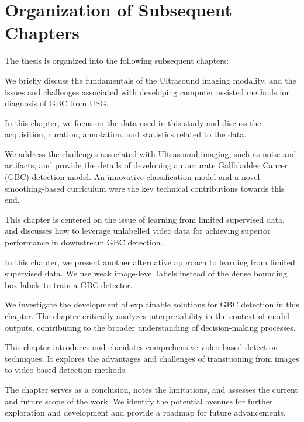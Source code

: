 \section{Organization of Subsequent Chapters}
%
The thesis is organized into the following subsequent chapters:

 We briefly discuss the fundamentals of the Ultrasound imaging modality, and the issues and challenges associated with developing computer assisted methods for diagnosis of GBC from USG.  

 In this chapter, we focus on the data used in this study and discuss the acquisition, curation, annotation, and statistics related to the data. 

 We address the challenges associated with Ultrasound imaging, such as noise and artifacts, and provide the details of developing an accurate Gallbladder Cancer (GBC) detection model. An innovative classification model and a novel smoothing-based curriculum were the key technical contributions towards this end.
    

 This chapter is centered on the issue of learning from limited supervised data, and discusses how to leverage unlabelled video data for achieving superior performance in downstream GBC detection.

 In this chapter, we present another alternative approach to learning from limited supervised data. We use weak image-level labels instead of the dense bounding box labels to train a GBC detector.

 We investigate the development of explainable solutions for GBC detection in this chapter. The chapter critically analyzes interpretability in the context of model outputs, contributing to the broader understanding of decision-making processes.

 This chapter introduces and elucidates comprehensive video-based detection techniques. It explores the advantages and challenges of transitioning from images to video-based detection methods.

 The chapter serves as a conclusion, notes the limitations, and assesses the current and future scope of the work. We identify the potential avenues for further exploration and development and provide a roadmap for future advancements.
